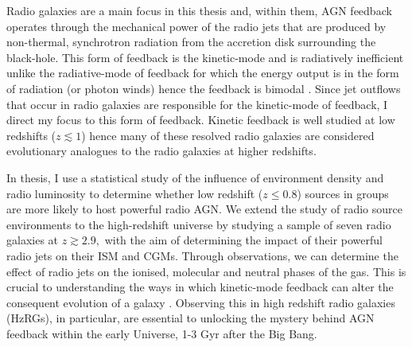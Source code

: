 \documentclass[11pt,a4paper,draft]{article}
\begin{document}
Radio galaxies are a main focus in this thesis and, within them, AGN feedback operates through the mechanical power of the radio jets that are produced by non-thermal, synchrotron radiation from the accretion disk surrounding the black-hole. This form of feedback is the kinetic-mode and is radiatively inefficient unlike the radiative-mode of feedback for which the energy output is in the form of radiation (or photon winds) hence the feedback is bimodal \citep{HeckmanBest2014}. Since jet outflows that occur in radio galaxies are responsible for the kinetic-mode of feedback, I direct my focus to this form of feedback. Kinetic feedback is well studied at low redshifts ($z \lesssim 1$) hence many of these resolved radio galaxies are considered evolutionary analogues to the radio galaxies at higher redshifts. 

In thesis, I use a statistical study of the influence of environment density and radio luminosity to determine whether low redshift ($z \leq 0.8$) sources in groups are more likely to host powerful radio AGN. We extend the study of radio source environments to the high-redshift universe by studying a sample of seven radio galaxies at $z \gtrsim 2.9,$ with the aim of determining the impact of their powerful radio jets on their ISM and CGMs. Through observations, we can determine the effect of radio jets on the ionised, molecular and neutral phases of the gas. This is crucial to understanding the ways in which kinetic-mode feedback can alter the consequent evolution of a galaxy \citep{Fabian2012}. Observing this in high redshift radio galaxies (HzRGs), in particular, are essential to unlocking the mystery behind AGN feedback within the early Universe, 1-3 Gyr after the Big Bang. 

\newpage


\end{document}
